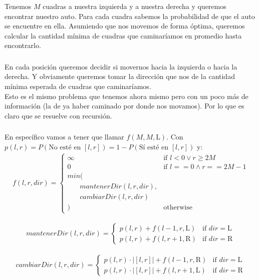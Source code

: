 \documentclass{beamer}
\newcommand{\tab}{\phantom{mm}}
\begin{document}
\begin{frame}
  \frametitle{\SECTIONB}
  \framesubtitle{\EJB}

  Tenemos \(M\) cuadras a nuestra izquierda y a nuestra derecha y queremos encontrar nuestro auto. Para cada cuadra sabemos la probabilidad de que el auto se encuentre en ella. Asumiendo que nos movemos de forma óptima, queremos calcular la cantidad mínima de cuadras que caminaríamos en promedio hasta encontrarlo.

\end{frame}

\begin{frame}
  \frametitle{\SECTIONB}
  \framesubtitle{\EJB}

  En cada posición queremos decidir si movernos hacia la izquierda o hacia la derecha. \pause Y obviamente queremos tomar la dirección que nos de la cantidad mínima esperada de cuadras que caminaríamos. \pause \\
  Esto es el mismo problema que tenemos ahora mismo pero con un poco más de información (la de ya haber caminado por donde nos movamos). Por lo que es claro que se resuelve con recursión.
\end{frame}

\begin{frame}
  \frametitle{\SECTIONB}
  \framesubtitle{\EJB}

  En específico vamos a tener que llamar \(f(M, M, \text{L})\). Con \(p(l, r) = P(\text{No esté en } [l, r]) = 1 - P(\text{Sí esté en } [l, r])\) y:
  \begin{gather*}
    f(l, r, dir) = \begin{cases}
      \infty & \text{if } l < 0 \lor r \geq 2M \\
      0 & \text{if } l == 0 \land r == 2M-1 \\
      min( \\
      \tab mantenerDir(l, r, dir), \\
      \tab cambiarDir(l, r, dir) \\
      ) & \text{otherwise}
    \end{cases}
  \end{gather*}

  \begin{gather*}
    mantenerDir(l, r, dir) = \begin{cases}
      p(l, r) + f(l-1, r, \text{L}) & \text{if } dir = \text{L} \\
      p(l, r) + f(l, r+1, \text{R}) & \text{if } dir = \text{R}
    \end{cases}
  \end{gather*}

  \begin{gather*}
    cambiarDir(l, r, dir) = \begin{cases}
      p(l, r) \cdot |[l, r]| + f(l-1, r, \text{R}) & \text{if } dir = \text{L} \\
      p(l, r) \cdot |[l, r]| + f(l, r+1, \text{L}) & \text{if } dir = \text{R}
    \end{cases}
  \end{gather*}
\end{frame}
\end{document}
